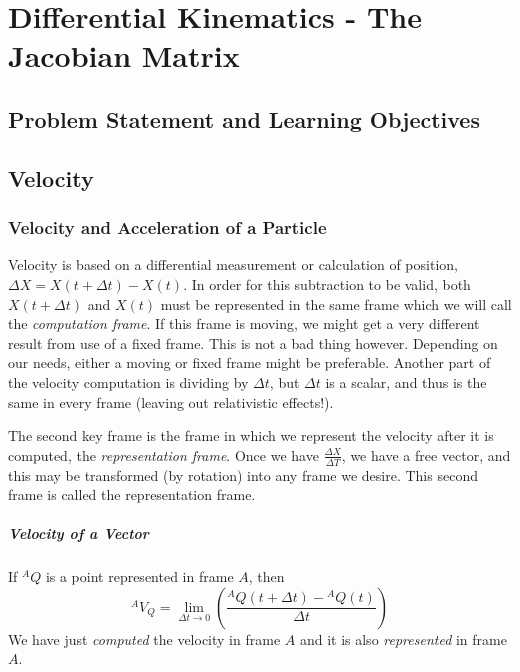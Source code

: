 %

\chapter{Differential Kinematics - The Jacobian Matrix}

\section{Problem Statement and Learning Objectives}



\section{Velocity}

\subsection{Velocity and Acceleration of a Particle}

Velocity is based on a differential measurement or calculation of position, $\Delta X = X(t+\Delta t) - X(t)$. In order for this subtraction to be valid, both $X(t+\Delta t)$ and $X(t)$ must be represented in the same frame which we will call the {\it computation frame}.   If this frame is moving, we might get a very different result from use of a fixed frame. This is not a bad thing however.  Depending on our needs, either a moving or fixed frame might be preferable.   Another part of the velocity computation is dividing by $\Delta t$, but $\Delta t$ is a scalar, and thus is the same in every frame (leaving out relativistic effects!).

The second key frame is the frame in which we represent the velocity after it is computed, the {\it representation frame}.   Once we have
$\frac{\Delta X}{\Delta T}$, we have a free vector, and this may be transformed (by rotation) into any frame we desire.  This second frame is called the representation frame.


\renewcommand\arraystretch{0.2}%


\paragraph{Velocity of a Vector}
If $^AQ$ is a point represented in frame $A$, then
\[
^AV_Q = \lim_{\Delta t \to 0} \left( \frac{
     ^AQ(t+\Delta t) - {^AQ}(t)}
     {\Delta t} \right)
\]
We have just {\it computed} the velocity in frame $A$ and it is also {\it represented}
in frame $A$.

